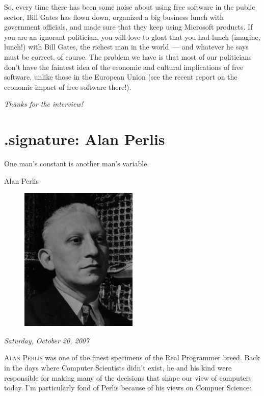 \documentclass{book}
\begin{document}
So, every time there has been some noise about using free software in
the public sector, Bill Gates has flown down, organized a big business
lunch with government officials, and made sure that they keep using
Microsoft products. If you are an ignorant politician, you will love
to gloat that you had lunch (imagine, lunch!) with Bill Gates, the
richest man in the world~--- and whatever he says must be correct, of
course. The problem we have is that most of our politicians don't have
the faintest idea of the economic and cultural implications of free
software, unlike those in the European Union (see the recent report on
the economic impact of free software there!).

\bigskip

\emph{Thanks for the interview!}

\chapter{.signature: Alan Perlis}

\epigraph{One man's constant is another man's variable.}{Alan Perlis}

\begin{figure}
\begin{center}
\includegraphics[width=0.50\textwidth]{alan_perlis}
\end{center}
\end{figure}

\begin{flushright}
  \emph{Saturday, October 20, 2007}
\end{flushright}

\lettrine{A}{lan Perlis} was one of the finest specimens of the Real
Programmer breed. Back in the days where Computer Scientists didn't
exist, he and his kind were responsible for making many of the
decisions that shape our view of computers today. I'm particularly
fond of Perlis because of his views on Compuer Science:
\end{document}
